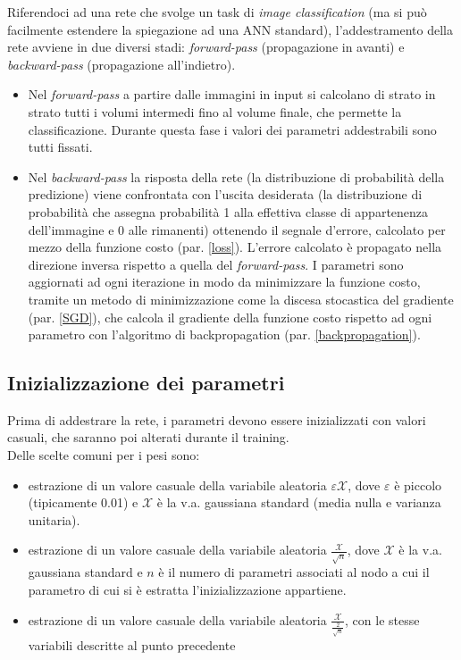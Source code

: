 Riferendoci ad una rete che svolge un task di \textit{image classification} (ma si può facilmente estendere la spiegazione ad una ANN standard), l'addestramento della rete avviene in due diversi stadi: \textit{forward-pass} (propagazione in avanti) e \textit{backward-pass} (propagazione all'indietro).
\begin{itemize}
\item Nel \textit{forward-pass} a partire dalle immagini in input si calcolano di strato in strato tutti i volumi intermedi fino al volume finale, che permette la classificazione. Durante questa fase i valori dei parametri addestrabili sono tutti fissati.
\item Nel \textit{backward-pass} la risposta della rete (la distribuzione di probabilità della predizione) viene confrontata con l'uscita desiderata (la distribuzione di probabilità che assegna probabilità 1 alla effettiva classe di appartenenza dell'immagine e 0 alle rimanenti) ottenendo il segnale d'errore, calcolato per mezzo della funzione costo (par. \ref{loss}). L'errore calcolato è propagato nella direzione inversa rispetto a quella del \textit{forward-pass}. I parametri sono aggiornati ad ogni iterazione in modo da minimizzare la funzione costo, tramite un metodo di minimizzazione come la discesa stocastica del gradiente (par. \ref{SGD}), che calcola il gradiente della funzione costo rispetto ad ogni parametro con l'algoritmo di backpropagation (par. \ref{backpropagation}).
\end{itemize}

\subsection{Inizializzazione dei parametri}
\label{weights}
Prima di addestrare la rete, i parametri devono essere inizializzati con valori casuali, che saranno poi alterati durante il training.\\
Delle scelte comuni per i pesi sono:
\begin{itemize}
\item estrazione di un valore casuale della variabile aleatoria $\varepsilon \mathcal{X}$, dove $\varepsilon$ è piccolo (tipicamente 0.01) e $\mathcal{X}$ è la v.a. gaussiana standard (media nulla e varianza unitaria).
\item estrazione di un valore casuale della variabile aleatoria $\frac{\mathcal{X}}{\sqrt{n}}$, dove $\mathcal{X}$ è la v.a. gaussiana standard e $n$ è il numero di parametri associati al nodo a cui il parametro di cui si è estratta l'inizializzazione appartiene.
\item estrazione di un valore casuale della variabile aleatoria $\frac{\mathcal{X}}{\frac{2}{\sqrt{n}}}$, con le stesse variabili descritte al punto precedente
\end{itemize}

